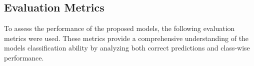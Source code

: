         
        
      
    \subsection{Evaluation Metrics}
        To assess the performance of the proposed models, the following evaluation metrics were used. These metrics provide a comprehensive understanding of the models classification ability by analyzing both correct predictions and class-wise performance.
        
